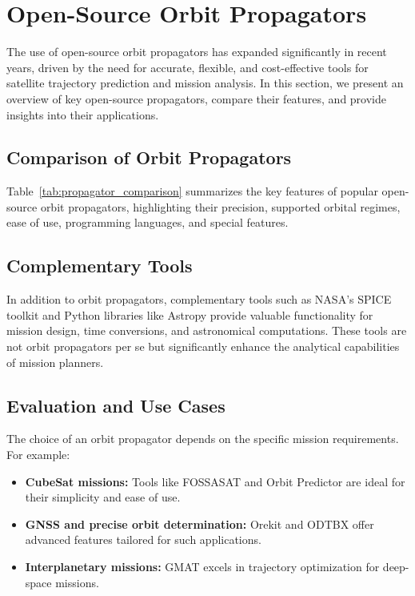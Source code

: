 % 

\section{Open-Source Orbit Propagators}
\label{sec:orbit_propagators}

The use of open-source orbit propagators has expanded significantly in recent years, driven by the need for accurate, flexible, and cost-effective tools for satellite trajectory prediction and mission analysis. In this section, we present an overview of key open-source propagators, compare their features, and provide insights into their applications.
\FloatBarrier %

\subsection{Comparison of Orbit Propagators}
Table~\ref{tab:propagator_comparison} summarizes the key features of popular open-source orbit propagators, highlighting their precision, supported orbital regimes, ease of use, programming languages, and special features.



\subsection{Complementary Tools}
In addition to orbit propagators, complementary tools such as NASA's SPICE toolkit and Python libraries like Astropy provide valuable functionality for mission design, time conversions, and astronomical computations. These tools are not orbit propagators per se but significantly enhance the analytical capabilities of mission planners.

\subsection{Evaluation and Use Cases}
The choice of an orbit propagator depends on the specific mission requirements. For example:
\begin{itemize}
    \item \textbf{CubeSat missions:} Tools like FOSSASAT and Orbit Predictor are ideal for their simplicity and ease of use.
    \item \textbf{GNSS and precise orbit determination:} Orekit and ODTBX offer advanced features tailored for such applications.
    \item \textbf{Interplanetary missions:} GMAT excels in trajectory optimization for deep-space missions.
\end{itemize}


